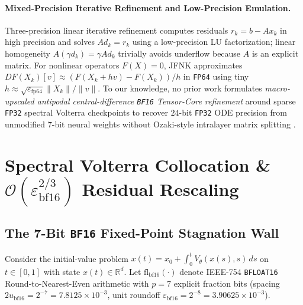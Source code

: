 \documentclass[11pt,a4paper]{article}
\theoremstyle{definition}
\theoremstyle{remark}
\newcommand{\bfsixteen}{\texttt{BF16}}
\newcommand{\fpthirtytwo}{\texttt{FP32}}
\newcommand{\fpsixtyfour}{\texttt{FP64}}
\newcommand{\epsbf}{\varepsilon_{\mathrm{bf16}}}
\begin{document}
\paragraph{Mixed-Precision Iterative Refinement and Low-Precision Emulation.}
Three-precision linear iterative refinement \citep{higham2002accuracy,carson2018accelerating,haidar2018harnessing} computes residuals $r_k = b - Ax_k$ in high precision and solves $Ad_k = r_k$ using a low-precision LU factorization; linear homogeneity $A(\gamma d_k) = \gamma A d_k$ trivially avoids underflow because $A$ is an explicit matrix. For nonlinear operators $F(X)=0$, \textsc{JFNK} \citep{knoll2004jacobian} approximates $DF(X_k)[v] \approx (F(X_k + h v) - F(X_k))/h$ in \fpsixtyfour{} using tiny $h \approx \sqrt{\varepsilon_{\mathrm{fp64}}}\|X_k\|/\|v\|$. To our knowledge, no prior work formulates \emph{macro-upscaled antipodal central-difference \bfsixteen{} Tensor-Core refinement} around sparse \fpthirtytwo{} spectral Volterra checkpoints to recover $24$-bit \fpthirtytwo{} ODE precision from unmodified $7$-bit neural weights without Ozaki-style intralayer matrix splitting \citep{ozaki2012error,ootomo2024recovering}.

\section{Spectral Volterra Collocation \& $\mathcal{O}(\epsbf^{2/3})$ Residual Rescaling}
\label{sec:method}

\subsection{The 7-Bit \bfsixteen{} Fixed-Point Stagnation Wall}
Consider the initial-value problem $x(t) = x_0 + \int_0^t V_\theta(x(s), s)\,ds$ on $t \in [0, 1]$ with state $x(t) \in \mathbb{R}^d$. Let $\mathrm{fl}_{\mathrm{bf16}}(\cdot)$ denote IEEE-754 \texttt{BFLOAT16} Round-to-Nearest-Even arithmetic with $p=7$ explicit fraction bits (spacing $2 u_{\mathrm{bf16}} = 2^{-7} = 7.8125 \times 10^{-3}$, unit roundoff $\epsbf = 2^{-8} = 3.90625 \times 10^{-3}$).
\end{document}
